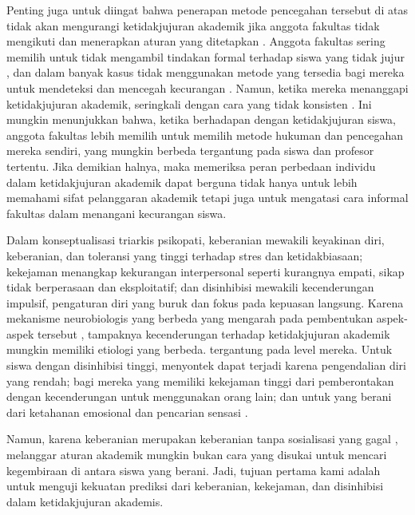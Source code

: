Penting juga untuk diingat bahwa penerapan metode pencegahan tersebut di atas tidak akan mengurangi ketidakjujuran akademik jika anggota fakultas tidak mengikuti dan menerapkan aturan yang ditetapkan \citep{mccabe1997individual}. Anggota fakultas sering memilih untuk tidak mengambil tindakan formal terhadap siswa yang tidak jujur \citep{chirikov2020role}, dan dalam banyak kasus tidak menggunakan metode yang tersedia bagi mereka untuk mendeteksi dan mencegah kecurangan \citep{sattler2017use}. Namun, ketika mereka menanggapi ketidakjujuran akademik, seringkali dengan cara yang tidak konsisten \citep{mahmud2019students}. Ini mungkin menunjukkan bahwa, ketika berhadapan dengan ketidakjujuran siswa, anggota fakultas lebih memilih untuk memilih metode hukuman dan pencegahan mereka sendiri, yang mungkin berbeda tergantung pada siswa dan profesor tertentu. Jika demikian halnya, maka memeriksa peran perbedaan individu dalam ketidakjujuran akademik dapat berguna tidak hanya untuk lebih memahami sifat pelanggaran akademik tetapi juga untuk mengatasi cara informal fakultas dalam menangani kecurangan siswa.

Dalam konseptualisasi triarkis psikopati, keberanian mewakili keyakinan diri, keberanian, dan toleransi yang tinggi terhadap stres dan ketidakbiasaan; kekejaman menangkap kekurangan interpersonal seperti kurangnya empati, sikap tidak berperasaan dan eksploitatif; dan disinhibisi mewakili kecenderungan impulsif, pengaturan diri yang buruk dan fokus pada kepuasan langsung. Karena mekanisme neurobiologis yang berbeda yang mengarah pada pembentukan aspek-aspek tersebut \citep{patrick2012conceptualizing}, tampaknya kecenderungan terhadap ketidakjujuran akademik mungkin memiliki etiologi yang berbeda. tergantung pada level mereka. Untuk siswa dengan disinhibisi tinggi, menyontek dapat terjadi karena pengendalian diri yang rendah; bagi mereka yang memiliki kekejaman tinggi dari pemberontakan dengan kecenderungan untuk menggunakan orang lain; dan untuk yang berani dari ketahanan emosional dan pencarian sensasi \citep{curtis2018self} \citep{drislane2014clarifying} \citep{nathanson2006predictors}.

Namun, karena keberanian merupakan keberanian tanpa sosialisasi yang gagal \citep{hall2009interview}, melanggar aturan akademik mungkin bukan cara yang disukai untuk mencari kegembiraan di antara siswa yang berani. Jadi, tujuan pertama kami adalah untuk menguji kekuatan prediksi dari keberanian, kekejaman, dan disinhibisi dalam ketidakjujuran akademis.


